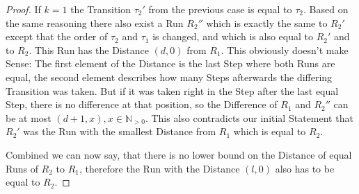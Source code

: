 \begin{proof}
If \(k = 1\) the Transition \(\tau_2'\) from the previous case is equal to \(\tau_2\).
Based on the same reasoning there also exist a Run \(R_2''\) which is exactly the same to \(R_2'\) except that the order of \(\tau_2\) and \(\tau_1\) is changed, and which is also equal to \(R_2'\) and to \(R_2\).
This Run has the Distance \((d, 0)\) from \(R_1\).
This obviously doesn't make Sense: The first element of the Distance is the last Step where both Runs are equal, the second element describes how many Steps afterwards the differing Transition was taken.
But if it was taken right in the Step after the last equal Step, there is no difference at that position, so the Difference of \(R_1\) and \(R_2''\) can be at most \((d+1, x), x \in \mathbb{N}_{>0}\).
This also contradicts our initial Statement that \(R_2'\) was the Run with the smallest Distance from \(R_1\) which is equal to \(R_2\).

Combined we can now say, that there is no lower bound on the Distance of equal Runs of \(R_2\) to \(R_1\), therefore the Run with the Distance \((l, 0)\) also has to be equal to \(R_2\).

\end{proof}




